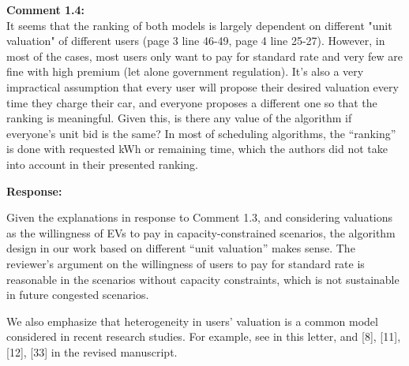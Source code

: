 \documentclass[11pt]{article}
\begin{document}
 




\vspace{5mm}
{
{\color{blue}\noindent\textbf{Comment 1.4:}\\
It seems that the ranking of both models is largely dependent on different "unit valuation" of different users (page 3 line 46-49, page 4 line 25-27). However, in most of the cases, most users only want to pay for standard rate and very few are fine with high premium (let alone government regulation). It’s also a very impractical assumption that every user will propose their desired valuation every time they charge their car, and everyone proposes a different one so that the ranking is meaningful. Given this, is there any value of the algorithm if everyone's unit bid is the same? In most of scheduling algorithms, the “ranking” is done with requested kWh or remaining time, which the authors did not take into account in their presented ranking.
}}

\vspace{5mm}
\noindent\textbf{Response:}

Given the explanations in response to Comment 1.3, and considering valuations as the willingness of EVs to pay in capacity-constrained scenarios, the algorithm design in our work based on different ``unit valuation'' makes sense. The reviewer's argument on the willingness of users to pay for standard rate is reasonable in the scenarios without capacity constraints, which is not sustainable in future congested scenarios. 

We also emphasize that heterogeneity in users' valuation is a common model considered in recent research studies. For example, see \cite{robu2011online,gerding2011online,stein2012model} in this letter, and [8], [11], [12], [33] in the revised manuscript.
\end{document}
